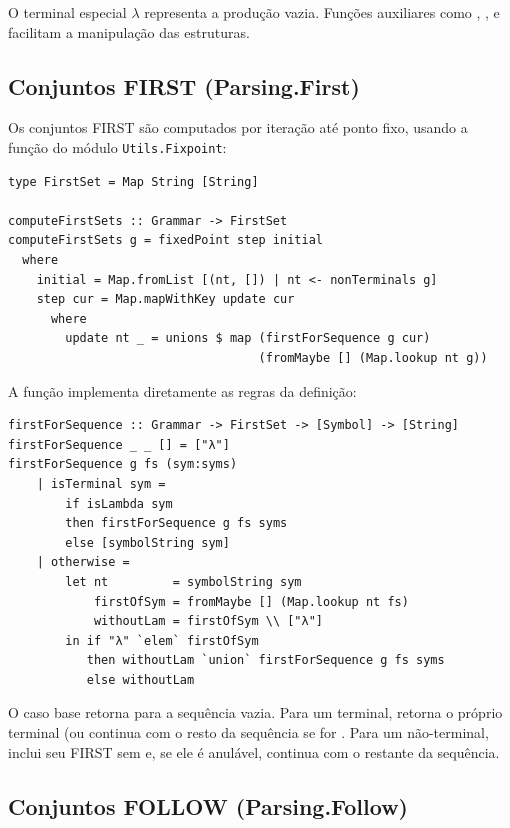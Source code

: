 O terminal especial $\lambda$ representa a
produção vazia. Funções auxiliares como
,
,
 e
 facilitam a manipulação
das estruturas.

\subsection{Conjuntos FIRST (Parsing.First)}

Os conjuntos FIRST são computados por iteração até ponto fixo, usando
a função  do módulo
\verb|Utils.Fixpoint|:

\begin{verbatim}
type FirstSet = Map String [String]

computeFirstSets :: Grammar -> FirstSet
computeFirstSets g = fixedPoint step initial
  where
    initial = Map.fromList [(nt, []) | nt <- nonTerminals g]
    step cur = Map.mapWithKey update cur
      where
        update nt _ = unions $ map (firstForSequence g cur)
                                   (fromMaybe [] (Map.lookup nt g))
\end{verbatim}

A função  implementa
diretamente as regras da definição:

\begin{verbatim}
firstForSequence :: Grammar -> FirstSet -> [Symbol] -> [String]
firstForSequence _ _ [] = ["λ"]
firstForSequence g fs (sym:syms)
    | isTerminal sym =
        if isLambda sym
        then firstForSequence g fs syms
        else [symbolString sym]
    | otherwise =
        let nt         = symbolString sym
            firstOfSym = fromMaybe [] (Map.lookup nt fs)
            withoutLam = firstOfSym \\ ["λ"]
        in if "λ" `elem` firstOfSym
           then withoutLam `union` firstForSequence g fs syms
           else withoutLam
\end{verbatim}

O caso base retorna \haskell{["λ"]} para a sequência
vazia. Para um terminal, retorna o próprio terminal (ou continua com
o resto da sequência se for . Para um
não-terminal, inclui seu FIRST sem  e, se
ele é anulável, continua com o restante da sequência.

\subsection{Conjuntos FOLLOW (Parsing.Follow)}

